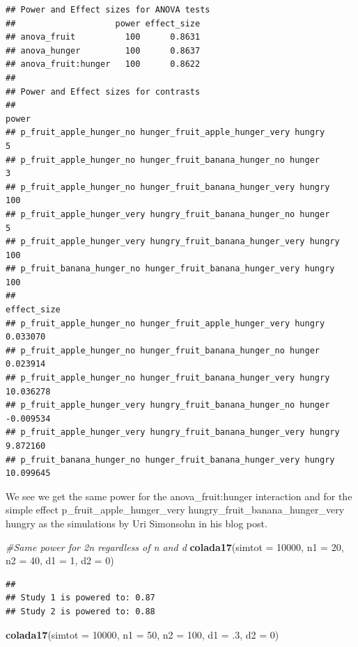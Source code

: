 \documentclass[]{book}
\newenvironment{Shaded}{\begin{snugshade}}{\end{snugshade}}
\newcommand{\CommentTok}[1]{\textcolor[rgb]{0.56,0.35,0.01}{\textit{#1}}}
\newcommand{\DataTypeTok}[1]{\textcolor[rgb]{0.13,0.29,0.53}{#1}}
\newcommand{\DecValTok}[1]{\textcolor[rgb]{0.00,0.00,0.81}{#1}}
\newcommand{\FloatTok}[1]{\textcolor[rgb]{0.00,0.00,0.81}{#1}}
\newcommand{\KeywordTok}[1]{\textcolor[rgb]{0.13,0.29,0.53}{\textbf{#1}}}
\newcommand{\NormalTok}[1]{#1}
\begin{document}
\begin{verbatim}
## Power and Effect sizes for ANOVA tests
##                    power effect_size
## anova_fruit          100      0.8631
## anova_hunger         100      0.8637
## anova_fruit:hunger   100      0.8622
## 
## Power and Effect sizes for contrasts
##                                                                  power
## p_fruit_apple_hunger_no hunger_fruit_apple_hunger_very hungry        5
## p_fruit_apple_hunger_no hunger_fruit_banana_hunger_no hunger         3
## p_fruit_apple_hunger_no hunger_fruit_banana_hunger_very hungry     100
## p_fruit_apple_hunger_very hungry_fruit_banana_hunger_no hunger       5
## p_fruit_apple_hunger_very hungry_fruit_banana_hunger_very hungry   100
## p_fruit_banana_hunger_no hunger_fruit_banana_hunger_very hungry    100
##                                                                  effect_size
## p_fruit_apple_hunger_no hunger_fruit_apple_hunger_very hungry       0.033070
## p_fruit_apple_hunger_no hunger_fruit_banana_hunger_no hunger        0.023914
## p_fruit_apple_hunger_no hunger_fruit_banana_hunger_very hungry     10.036278
## p_fruit_apple_hunger_very hungry_fruit_banana_hunger_no hunger     -0.009534
## p_fruit_apple_hunger_very hungry_fruit_banana_hunger_very hungry    9.872160
## p_fruit_banana_hunger_no hunger_fruit_banana_hunger_very hungry    10.099645
\end{verbatim}

We see we get the same power for the anova\_fruit:hunger interaction and for the simple effect p\_fruit\_apple\_hunger\_very hungry\_fruit\_banana\_hunger\_very hungry as the simulations by Uri Simonsohn in his blog post.

\begin{Shaded}
\begin{Highlighting}[]
\CommentTok{#Same power for 2n regardless of n and d}
\KeywordTok{colada17}\NormalTok{(}\DataTypeTok{simtot =} \DecValTok{10000}\NormalTok{, }\DataTypeTok{n1 =} \DecValTok{20}\NormalTok{, }\DataTypeTok{n2 =} \DecValTok{40}\NormalTok{, }\DataTypeTok{d1 =} \DecValTok{1}\NormalTok{, }\DataTypeTok{d2 =} \DecValTok{0}\NormalTok{)  }
\end{Highlighting}
\end{Shaded}

\begin{verbatim}
## 
## Study 1 is powered to: 0.87
## Study 2 is powered to: 0.88
\end{verbatim}

\begin{Shaded}
\begin{Highlighting}[]
\KeywordTok{colada17}\NormalTok{(}\DataTypeTok{simtot =} \DecValTok{10000}\NormalTok{, }\DataTypeTok{n1 =} \DecValTok{50}\NormalTok{, }\DataTypeTok{n2 =} \DecValTok{100}\NormalTok{, }\DataTypeTok{d1 =} \FloatTok{.3}\NormalTok{, }\DataTypeTok{d2 =} \DecValTok{0}\NormalTok{)}
\end{Highlighting}
\end{Shaded}
\end{document}
